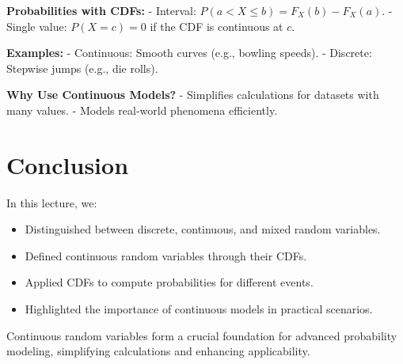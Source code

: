 \documentclass{article}
\begin{document}
\textbf{Probabilities with CDFs:}
- Interval: $P(a < X \leq b) = F_X(b) - F_X(a)$.
- Single value: $P(X = c) = 0$ if the CDF is continuous at $c$.

\textbf{Examples:}
- Continuous: Smooth curves (e.g., bowling speeds).
- Discrete: Stepwise jumps (e.g., die rolls).

\textbf{Why Use Continuous Models?}
- Simplifies calculations for datasets with many values.
- Models real-world phenomena efficiently.

\section*{Conclusion}

In this lecture, we:
\begin{itemize}
  \item Distinguished between discrete, continuous, and mixed random variables.
  \item Defined continuous random variables through their CDFs.
  \item Applied CDFs to compute probabilities for different events.
  \item Highlighted the importance of continuous models in practical scenarios.
\end{itemize}

Continuous random variables form a crucial foundation for advanced probability modeling, simplifying calculations and enhancing applicability.
\end{document}
